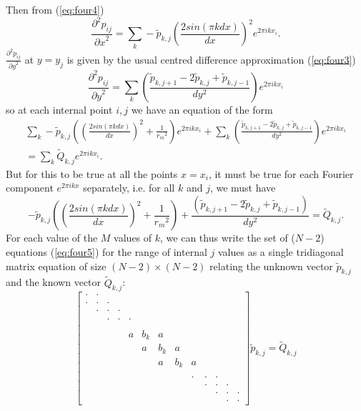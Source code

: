 \documentclass[11pt, a4paper,twoside]{article}
\newcommand{\rdm}[0]{{r_m}}
\newcommand{\ps}[2]{\frac{\partial^2 #1}{{\partial #2}^2}}
\numberwithin{equation}{section}
\begin{document}
Then from (\ref{eq:four4})
\begin{equation}
\ps{p_{ij}}{x} = \sum_k -\tilde{p}_{k,j}  \left(\frac{2 sin(\pi k dx)}{dx}\right)^2e^{2\pi i k x_i}.
\end{equation}
$\ps{p_{ij}}{y}$ at $y = y_j$ is given by the usual centred difference approximation (\ref{eq:four3})
\begin{equation}
\ps{p_{ij}}{y} = \sum_k \left( \frac{\tilde{p}_{k,j+1} - 2\tilde{p}_{k,j} + \tilde{p}_{k,j-1}}{dy^2}\right) e^{2\pi i k x_i}
\end{equation}
so at each internal point $i,j$ we have an equation of the form
\begin{multline}
\sum_k -\tilde{p}_{k,j} \left( \left(\frac{2 sin(\pi k dx)}{dx}\right)^2 + \frac{1}{\rdm^2} \right)e^{2\pi i k x_i}  + \sum_k \left( \frac{\tilde{p}_{k,j+1} - 2\tilde{p}_{k,j} + \tilde{p}_{k,j-1}}{dy^2}\right) e^{2\pi i k x_i}  \\
= \sum_k \tilde{ Q}_{k,j} e^{2\pi i k x_i} .
\end{multline}
But for this to be true at all the points $x = x_i$, it must be true for each Fourier component $e^{2\pi i k x} $ separately, i.e. for all $k$ and $j$, we must have
\begin{equation}\label{eq:four5}
-\tilde{p}_{k,j} \left( \left(\frac{2 sin(\pi k dx)}{dx}\right)^2 + \frac{1}{\rdm^2} \right) + \frac{ \left( \tilde{p}_{k,j+1} - 2\tilde{p}_{k,j} + \tilde{p}_{k,j-1}\right)}{dy^2} = \tilde{ Q}_{k,j}.
\end{equation}
For each value of the $M$ values of $k$, we can thus write the set of ($N-2$) equations (\ref{eq:four5}) for the range of internal $j$ values as a single tridiagonal matrix equation of size $(N-2) \times (N-2)$ relating the unknown vector $\tilde{p}_{k,j}$ and the known vector $\tilde{ Q}_{k,j}$:
\begin{equation}
\left[ \begin{array}{ccccccccccccc}
\cdot & \cdot& & &\\
\cdot & \cdot& \cdot& &\\
 & \cdot & \cdot& \cdot& &\\
 &  & \cdot & \cdot& \cdot& &\\
\\
 &  & & & a & b_k & a & \\
 & &  & & & a & b_k & a & \\
 & & & & & & a & b_k & a & \\
\\
& & & & & & & & \cdot & \cdot& \cdot& &\\
& & & & & & & & & \cdot & \cdot& \cdot&\\
& & & & & & & & &  & \cdot & \cdot& \cdot\\
& & & & & & & & &  & & \cdot & \cdot
\end{array}\right] \tilde{p}_{k,j} = \tilde{ Q}_{k,j}
\end{equation}
\end{document}
